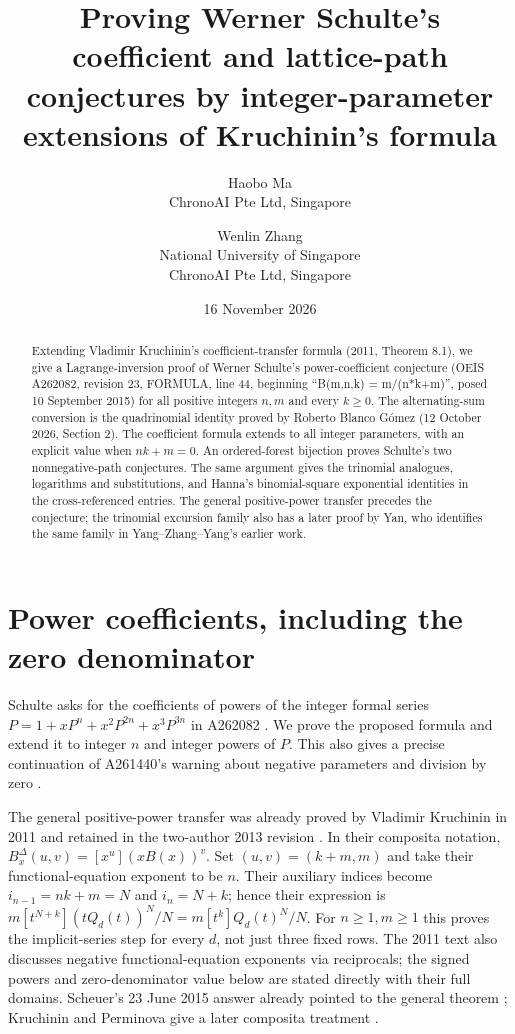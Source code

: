 \documentclass[11pt]{article}
\title{Proving Werner Schulte's coefficient and lattice-path conjectures by integer-parameter extensions of Kruchinin's formula}
\author{Haobo Ma\\\small ChronoAI Pte Ltd, Singapore
\and Wenlin Zhang\\\small National University of Singapore\\\small ChronoAI Pte Ltd, Singapore}
\date{16 November 2026}
\begin{document}
\maketitle
\begin{abstract}
Extending Vladimir Kruchinin's coefficient-transfer formula (2011,
Theorem 8.1), we give a Lagrange-inversion proof of Werner Schulte's
power-coefficient conjecture (OEIS A262082, revision 23, FORMULA,
line 44, beginning ``B(m,n,k) = m/(n*k+m)'', posed 10 September 2015)
for all positive integers $n,m$ and every $k\geq0$.
The alternating-sum conversion is the quadrinomial identity proved by
Roberto Blanco G\'omez (12 October 2026, Section 2).
The coefficient formula extends to all integer parameters, with an explicit
value when $nk+m=0$. An ordered-forest bijection proves Schulte's two
nonnegative-path conjectures. The same argument gives the trinomial
analogues, logarithms and substitutions, and Hanna's binomial-square
exponential identities in the cross-referenced entries. The general
positive-power transfer precedes the conjecture; the trinomial excursion
family also has a later proof by Yan, who identifies the same family
in Yang--Zhang--Yang's earlier work.
\end{abstract}

\section{Power coefficients, including the zero denominator}
Schulte asks for the coefficients of powers of the integer formal series
$P=1+xP^n+x^2P^{2n}+x^3P^{3n}$ in A262082 \cite{schulte}.
We prove the proposed formula and extend it to integer $n$ and integer
powers of $P$. This also gives a precise continuation of A261440's warning
about negative parameters and division by zero \cite{trinomial}.

The general positive-power transfer was already proved by Vladimir
Kruchinin in 2011 \cite[Theorem 8.1, pp.~13--14]{kruchinin1} and retained
in the two-author 2013 revision \cite[Theorem 28, equation (26),
pp.~23--24]{kruchinin2}. In their composita notation,
$B_x^\Delta(u,v)=[x^u](xB(x))^v$. Set $(u,v)=(k+m,m)$ and take
their functional-equation exponent to be $n$. Their auxiliary indices
become $i_{n-1}=nk+m=N$ and $i_n=N+k$; hence their expression is
$m[t^{N+k}](tQ_d(t))^N/N=m[t^k]Q_d(t)^N/N$.
For $n\geq1,m\geq1$ this proves the implicit-series step for every $d$,
not just three fixed rows. The 2011 text also discusses negative
functional-equation exponents via reciprocals; the signed powers and
zero-denominator value below are stated directly with their full domains.
Scheuer's 23 June 2015 answer already pointed to the general theorem
\cite{scheuer}; Kruchinin and Perminova give a later composita treatment
\cite[Theorem 2.3]{perminova}.
\end{document}
